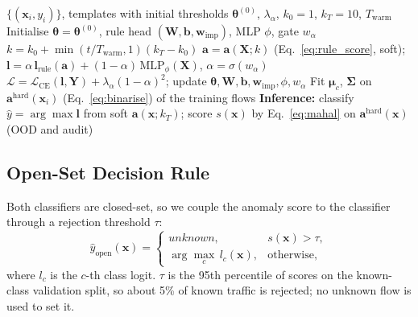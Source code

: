 \documentclass[journal]{IEEEtran}
\begin{document}
\begin{algorithm}[!t]
\caption{NeSy-NIDS Training and OOD Scoring}
\label{alg:nesy}
\begin{algorithmic}[1]
\footnotesize
\Require $\{(\mathbf{x}_i,y_i)\}$, templates with initial thresholds $\boldsymbol{\theta}^{(0)}$, $\lambda_\alpha$, $k_0{=}1$, $k_T{=}10$, $T_{\mathrm{warm}}$
\State Initialise $\boldsymbol{\theta}{=}\boldsymbol{\theta}^{(0)}$, rule head $(\mathbf{W},\mathbf{b},\mathbf{w}_{\mathrm{imp}})$, MLP $\phi$, gate $w_\alpha$
  \State $k{=}k_0{+}\min(t/T_{\mathrm{warm}},1)(k_T{-}k_0)$
    \State $\mathbf{a}{=}\mathbf{a}(\mathbf{X};k)$ (Eq.~\ref{eq:rule_score}, soft);\; $\mathbf{l}{=}\alpha\,\mathbf{l}_{\mathrm{rule}}(\mathbf{a}){+}(1{-}\alpha)\,\mathrm{MLP}_\phi(\mathbf{X})$, $\alpha{=}\sigma(w_\alpha)$
    \State $\mathcal{L}{=}\mathcal{L}_{\mathrm{CE}}(\mathbf{l},\mathbf{Y}){+}\lambda_\alpha(1{-}\alpha)^2$;\; update $\boldsymbol{\theta},\mathbf{W},\mathbf{b},\mathbf{w}_{\mathrm{imp}},\phi,w_\alpha$
  \EndFor
\EndFor
\State Fit $\boldsymbol{\mu}_c$, $\boldsymbol{\Sigma}$ on $\mathbf{a}^{\mathrm{hard}}(\mathbf{x}_i)$ (Eq.~\ref{eq:binarise}) of the training flows
\State \textbf{Inference:} classify $\hat{y}{=}\arg\max\mathbf{l}$ from soft $\mathbf{a}(\mathbf{x};k_T)$; score $s(\mathbf{x})$ by Eq.~\ref{eq:mahal} on $\mathbf{a}^{\mathrm{hard}}(\mathbf{x})$ (OOD and audit)
\end{algorithmic}
\end{algorithm}

\subsection{Open-Set Decision Rule}
\label{sec:openset}

Both classifiers are closed-set, so we couple the anomaly score to the classifier through a rejection threshold $\tau$:
\begin{equation}
  \hat{y}_{\mathrm{open}}(\mathbf{x}) =
  \begin{cases}
    \textit{unknown}, & s(\mathbf{x}) > \tau,\\[2pt]
    \arg\max_c\, l_c(\mathbf{x}), & \text{otherwise},
  \end{cases}
\end{equation}
where $l_c$ is the $c$-th class logit. $\tau$ is the 95th percentile of scores on the known-class validation split, so about 5\% of known traffic is rejected; no unknown flow is used to set it.
\end{document}
